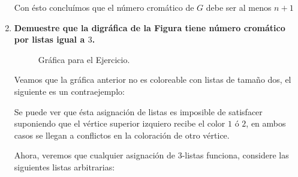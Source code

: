 \documentclass{article}
\begin{document}
\begin{enumerate}
      Con \'esto conclu\'imos que el n\'umero crom\'atico de $G$ debe ser al menos $n+1$


  \item \textbf{Demuestre que la digr\'afica de la Figura tiene
    n\'umero crom\'atico por listas igual a $3$.}
    \begin{figure}[ht!]
    \centering
    \caption{Gr\'afica para el Ejercicio.}
    \end{figure}

    Veamos que la gr\'afica anterior no es coloreable con listas de tamaño dos, el siguiente es un contraejemplo:

  \begin{figure}[ht!]
    \centering
  \end{figure}

   Se puede ver que \'esta asignaci\'on de listas es imposible de satisfacer suponiendo que el v\'ertice superior izquiero recibe el color $1$ \'o $2$, en ambos casos se llegan a conflictos en la coloraci\'on de otro v\'ertice.

   Ahora, veremos que cualquier asignaci\'on de $3$-listas funciona, considere las siguientes listas arbitrarias:


\end{enumerate}
\end{document}
